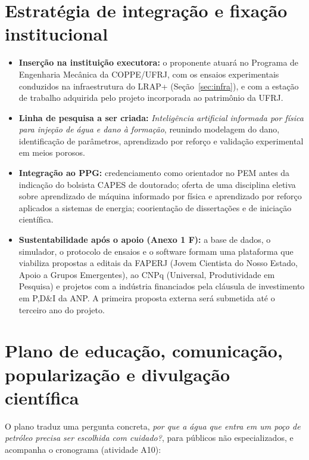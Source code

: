 \documentclass[11pt,a4paper]{article}
\newcommand{\itemedital}[1]{}
\begin{document}
\section{Estratégia de integração e fixação institucional}\itemedital{2.17; 1.4}
\begin{itemize}
  \item \textbf{Inserção na instituição executora:} o proponente atuará no Programa de
        Engenharia Mecânica da COPPE/UFRJ, com os ensaios experimentais conduzidos na
        infraestrutura do LRAP+ (Seção~\ref{sec:infra}), e com a estação de trabalho
        adquirida pelo projeto incorporada ao patrimônio da UFRJ.
  \item \textbf{Linha de pesquisa a ser criada:} \textit{Inteligência artificial informada por
        física para injeção de água e dano à formação}, reunindo modelagem do dano, identificação
        de parâmetros, aprendizado por reforço e validação experimental em meios porosos.
  \item \textbf{Integração ao PPG:} credenciamento como orientador no PEM antes da indicação do
        bolsista CAPES de doutorado; oferta de uma disciplina eletiva sobre aprendizado de
        máquina informado por física e aprendizado por reforço aplicados a sistemas de
        energia; coorientação de dissertações e de iniciação científica.
  \item \textbf{Sustentabilidade após o apoio (Anexo 1 F):} a base de dados, o simulador, o
        protocolo de ensaios e o software formam uma plataforma que viabiliza
        propostas a editais da FAPERJ (Jovem Cientista do Nosso Estado, Apoio a Grupos
        Emergentes), ao CNPq (Universal, Produtividade em Pesquisa) e projetos com a indústria
        financiados pela cláusula de investimento em P,D\&I da ANP. A primeira proposta externa
        será submetida até o terceiro ano do projeto.
\end{itemize}

\section{Plano de educação, comunicação, popularização e divulgação científica}\itemedital{2.18--2.20; critério 5}
O plano traduz uma pergunta concreta, \textit{por que a água que entra em um poço de petróleo
precisa ser escolhida com cuidado?}, para públicos não especializados, e acompanha o
cronograma (atividade A10):
\end{document}
